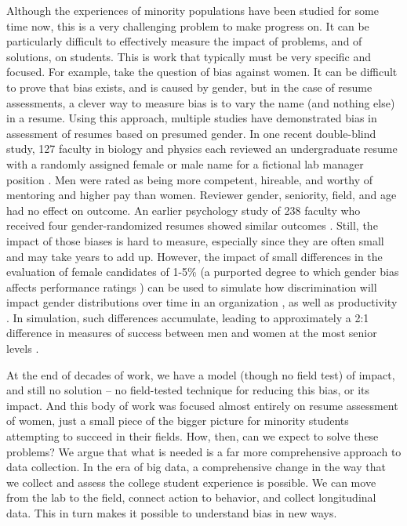  
Although the experiences of minority populations have been studied for some time now, this is a very challenging problem to make progress on. It can be particularly difficult to effectively measure the impact of problems, and of solutions, on students. This is work that typically must be very specific and focused. For example, take the question of bias against women. It can be difficult to prove that bias exists, and is caused by gender, but in the case of resume assessments, a clever way to measure bias is to vary the name (and nothing else) in a resume. Using this approach, multiple studies have demonstrated bias in assessment of resumes based on presumed gender. In one recent double-blind study, 127 faculty in biology and physics each reviewed an undergraduate resume with a randomly assigned female or male name for a fictional lab manager position \citep{Moss-Racusin:2012}. Men were rated as being more competent, hireable, and worthy of mentoring and higher pay than women. Reviewer gender, seniority, field, and age had no effect on outcome. An earlier psychology study of 238 faculty who received four gender-randomized resumes showed similar outcomes \citep{Steinpreis:1999}. Still, the impact of those biases is hard to measure, especially since they are often small and may take years to add up. However, the impact of small differences in the evaluation of female candidates of 1-5\% (a purported degree to which gender bias affects performance ratings \citep{Barrett:1993}) can be used to simulate how discrimination will impact gender distributions over time in an organization \citep{Martell:1996}, as well as productivity \citep{Cole:1991}. In simulation, such differences accumulate, leading to approximately a 2:1 difference in measures of success between men and women at the most senior levels \citep{Cole:1991,Martell:1996}. 

At the end of decades of work, we have a model (though no field test) of impact, and still no solution -- no field-tested technique for reducing this bias, or its impact. And this body of work was focused almost entirely on resume assessment of women, just a small piece of the bigger picture for minority students attempting to succeed in their fields. How, then, can we expect to solve these problems? We argue that what is needed is a far more comprehensive approach to data collection. In the era of big data, a comprehensive change in the way that we collect and assess the college student experience is possible. We can  move from the lab to the field,  connect action to behavior, and  collect longitudinal data. This in turn makes it possible to understand bias in  new ways.  

